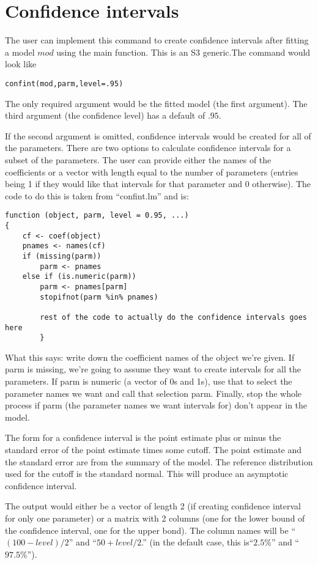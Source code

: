 \documentclass{article}
\begin{document}
\section{Confidence intervals}
The user can implement this command to create confidence intervals after  fitting a model $mod$ using the main function.  This is an S3 generic.The command would look like
\begin{verbatim}
confint(mod,parm,level=.95)
\end{verbatim}
The only required argument would be the fitted model (the first argument). The third argument (the confidence level) has a default of $.95$.

If the second argument is omitted, confidence intervals would be created for all of the parameters. There are two options to calculate confidence intervals for a subset of the parameters. The user can provide either  the names of the coefficients or a vector with length equal to the number of parameters (entries being 1 if they would like that intervals for that parameter and 0 otherwise).  The code to do this is taken from ``confint.lm'' and is:
\begin{verbatim}
function (object, parm, level = 0.95, ...) 
{
    cf <- coef(object)
    pnames <- names(cf)
    if (missing(parm)) 
        parm <- pnames
    else if (is.numeric(parm)) 
        parm <- pnames[parm]
        stopifnot(parm %in% pnames)
        
        rest of the code to actually do the confidence intervals goes here
        }
\end{verbatim}
What this says: write down the coefficient names of the object we're given. If parm is missing, we're going to assume they want to create intervals for all the parameters.  If parm is numeric (a vector of 0s and 1s), use that to select the parameter names we want and call that selection parm.  Finally, stop the whole process if parm (the parameter names we want intervals for) don't appear in the model.

The form for a confidence interval is the point estimate plus or minus the standard error of the point estimate times some cutoff.  The point estimate and the standard error are from the summary of the model. The reference distribution used for the cutoff is the standard normal. This will produce an asymptotic confidence interval.

The output would either be a vector of length 2 (if creating confidence interval for only one parameter) or a matrix with 2 columns (one for the lower bound of the confidence interval, one for the upper bond). The column names will be ``$(100-level)/2$'' and ``$50+level/2 $.'' (in the default case, this is``$2.5\%$'' and ``$97.5\%$'').
\end{document}

